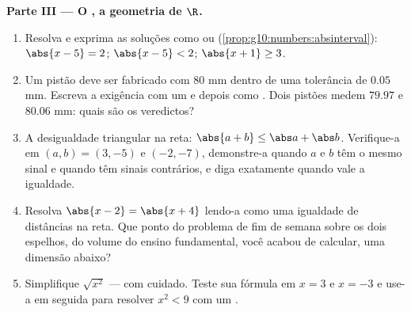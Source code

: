 \begin{problem}
\medskip
\noindent\textbf{Parte III --- O , a geometria de
$\R$.}
\begin{enumerate}[resume]
  \item Resolva e exprima as soluções como  ou 
        (\cref{prop:g10:numbers:absinterval}):
        $\abs{x - 5} = 2$; \quad $\abs{x - 5} < 2$; \quad
        $\abs{x + 1} \geq 3$.
  \item Um pistão deve ser fabricado com $80$ mm dentro de uma
        tolerância de $0.05$ mm. Escreva a exigência com um
         e depois como . Dois pistões medem
        $79.97$ e $80.06$ mm: quais são os veredictos?
  \item A desigualdade triangular na reta:
        $\abs{a + b} \leq \abs a + \abs b$. Verifique-a em
        $(a, b) = (3, -5)$ e $(-2, -7)$, demonstre-a quando $a$ e
        $b$ têm o mesmo sinal e quando têm sinais contrários, e
        diga exatamente quando vale a igualdade.
  \item Resolva $\abs{x - 2} = \abs{x + 4}$ lendo-a como uma
        igualdade de distâncias na reta. Que ponto do problema de
        fim de semana sobre os dois espelhos, do volume do ensino
        fundamental, você acabou de calcular, uma dimensão
        abaixo?
  \item Simplifique $\sqrt{x^2}$ --- com cuidado. Teste sua
        fórmula em $x = 3$ e $x = -3$ e use-a em seguida para
        resolver $x^2 < 9$ com um .
\end{enumerate}


\end{problem}
